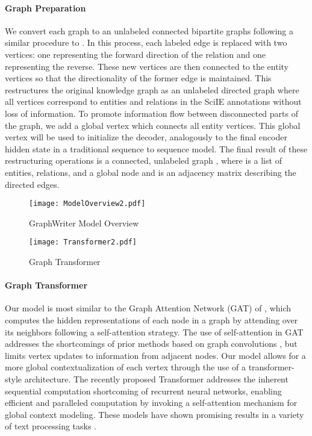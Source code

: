 \documentclass[11pt,a4paper]{article}
\begin{document}
\paragraph{Graph Preparation}
We convert each graph to an unlabeled connected bipartite graphs following a similar procedure to \citet{beck2018graph}. 
In this process, each labeled edge is replaced with two vertices: one representing the forward direction of the relation and one representing the reverse.
These new vertices are then connected to the entity vertices so that the directionality of the former edge is maintained.
This restructures the original knowledge graph as an unlabeled directed graph where all vertices correspond to entities and relations in the SciIE annotations without loss of information. 
To promote information flow between disconnected parts of the graph, we add a global vertex which connects all entity vertices. 
This global vertex will be used to initialize the decoder, analogously to the final encoder hidden state in a traditional sequence to sequence model.
The final result of these restructuring operations is a connected, unlabeled graph , where  is a list of entities, relations, and a global node and  is an adjacency matrix describing the directed edges. 


\begin{figure}
    \centering
    \texttt{[image: ModelOverview2.pdf]}
    \caption{GraphWriter Model Overview}
    \label{fig:model}
\end{figure}

\begin{figure}
    \centering
    \texttt{[image: Transformer2.pdf]}
    \caption{Graph Transformer}
    \label{fig:enc}
\end{figure}
\paragraph{Graph Transformer} 
Our model is most similar to the Graph Attention Network (GAT) of \citet{velickovic2017graph}, which computes the hidden representations of each node in a graph by attending over its neighbors following a self-attention strategy.
The use of self-attention in GAT addresses the shortcomings of prior methods based on graph convolutions \cite{Defferrard2016ConvolutionalNN,Kipf2016SemiSupervisedCW}, but limits vertex updates to information from adjacent nodes. 
Our model allows for a more global contextualization of each vertex through the use of a transformer-style architecture. 
The recently proposed Transformer \cite{vaswani2017attention} addresses the inherent sequential computation shortcoming of recurrent neural networks, enabling efficient and paralleled computation by invoking a self-attention mechanism for global context modeling.
These models have shown promising results in a variety of text processing tasks \cite{radford2018improving}.
\end{document}
